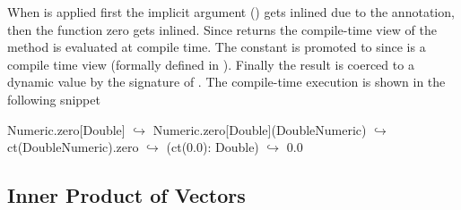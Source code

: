When  is applied first the implicit argument () gets inlined due to the  annotation,
then the function zero gets inlined. Since  returns the compile-time view
of  the method  is evaluated at compile time. The constant
 is promoted to  since  is a compile time view (formally defined in ).
Finally the  result is coerced to a dynamic value by the signature of . The
compile-time execution is shown in the following snippet\begin{lstparagraph}
Numeric.zero[Double]
  $\hookrightarrow$ Numeric.zero[Double](DoubleNumeric)
  $\hookrightarrow$ ct(DoubleNumeric).zero
  $\hookrightarrow$ (ct(0.0): Double)
  $\hookrightarrow$ 0.0
\end{lstparagraph}

\subsection{Inner Product of Vectors}
\label{sct:dot-product}

